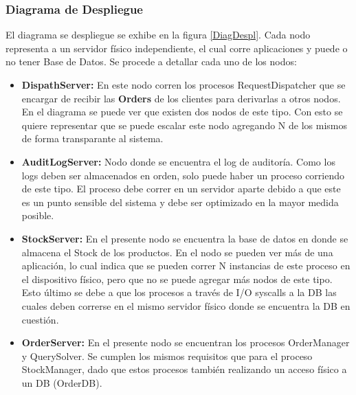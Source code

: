         \subsubsection{Diagrama de Despliegue}
        El diagrama se despliegue se exhibe en la figura \ref{DiagDespl}. Cada 
        nodo representa a un servidor físico independiente, el cual corre 
        aplicaciones y puede o no tener Base de Datos. Se procede a detallar
        cada uno de los nodos:

        \begin{itemize}
            \item \textbf{DispathServer:} En este nodo corren los procesos
            RequestDispatcher que se encargar de recibir las \textbf{Orders}
            de los clientes para derivarlas a otros nodos. En el diagrama
            se puede ver que existen dos nodos de este tipo. Con esto se 
            quiere representar que se puede escalar este nodo agregando
            N de los mismos de forma transparante al sistema.
            \item \textbf{AuditLogServer:} Nodo donde se encuentra el log 
            de auditoría. Como los logs deben ser almacenados en orden, 
            solo puede haber un proceso corriendo de este tipo. El proceso
            debe correr en un servidor aparte debido a que este es un punto
            sensible del sistema y debe ser optimizado en la mayor medida
            posible.
            \item \textbf{StockServer:} En el presente nodo se encuentra 
            la base de datos en donde se almacena el Stock de los productos.
            En el nodo se pueden ver más de una aplicación, lo cual indica
            que se pueden correr N instancias de este proceso en el dispositivo
            físico, pero que no se puede agregar más nodos de este tipo. Esto
            último se debe a que los procesos a través de I/O syscalls a la 
            DB las cuales deben correrse en el mismo servidor físico donde
            se encuentra la DB en cuestión.
            \item \textbf{OrderServer:} En el presente nodo se encuentran los
            procesos OrderManager y QuerySolver. Se cumplen los mismos 
            requisitos que para el proceso StockManager, dado que estos 
            procesos también realizando un acceso físico a un DB (OrderDB).
           
        \end{itemize}


